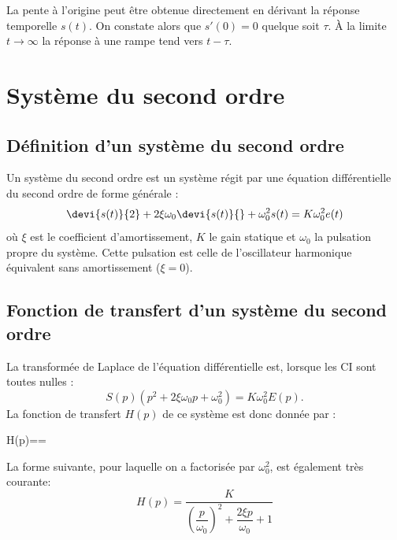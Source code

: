 La pente à l'origine peut être obtenue directement en dérivant la réponse temporelle $s(t)$. On constate 
alors que $s'(0)=0$ quelque soit $\tau$. 
À la limite $t\to\infty$ la réponse à une rampe tend vers $t-\tau$.


\section{Système du second ordre}

\subsection{Définition d'un système du second ordre}
Un système du second ordre est un système régit par une équation 
différentielle du second ordre de forme générale :
$$
\devi{s(t)}{2}+2\xi\omega_0\devi{s(t)}{}+\omega^2_0s(t)=K\omega^2_0e(t)
$$
où $\xi$ est le coefficient d'amortissement, $K$ le gain statique et $\omega_0$  
la pulsation propre du système. Cette pulsation est celle de l'oscillateur harmonique équivalent 
sans amortissement ($\xi=0$).

\subsection{Fonction de transfert d'un système du second ordre}
La transformée de Laplace de l'équation différentielle est, lorsque les CI sont toutes nulles :
$$
S(p)\left(p^2+2\xi\omega_0p+\omega^2_0\right)=K\omega^2_0E(p).
$$
La fonction de transfert $H(p)$ de ce système est donc donnée par :
\begin{bequation}
    H(p)==\label{eq-2nd_ft}
\end{bequation}
La forme suivante, pour laquelle on a factorisée par $\omega^2_0$, est également très courante:
$$
H(p)=\dfrac{K}{\left(\dfrac{p}{\omega_0}\right)^2+\dfrac{2\xi p}{\omega_0}+1}
$$

